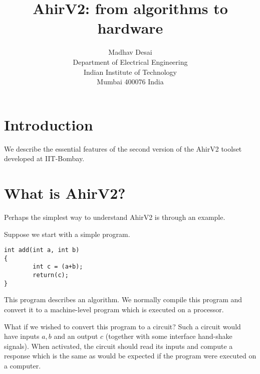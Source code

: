 \documentclass{article}
\title{AhirV2: from algorithms to hardware}
\author{Madhav Desai \\ Department of Electrical Engineering \\ Indian Institute of Technology \\
	Mumbai 400076 India}
\begin{document}
\maketitle

\section{Introduction}

We describe the essential features
of the second version of the AhirV2 toolset
developed at IIT-Bombay.

\section{What is AhirV2?}

Perhaps the simplest way to understand AhirV2 is
through an example.

Suppose we start with a simple program.
\begin{verbatim}
int add(int a, int b)
{
        int c = (a+b);
        return(c);
}
\end{verbatim}
This program describes an algorithm.  We normally
compile this program and convert it to a machine-level
program which is executed on a processor.

What if we wished to convert this program to
a circuit?  
Such a circuit would have inputs 
$a,b$ and an output $c$ (together with some
interface hand-shake signals).  When activated,
the circuit should read its inputs and compute 
a response which is the same as would be expected
if the program were executed on a computer.
\end{document}
